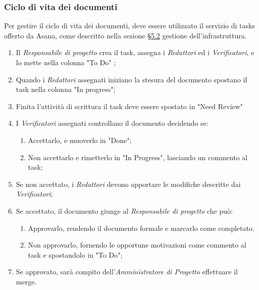 \subsubsection{Ciclo di vita dei documenti}
Per gestire il ciclo di vita dei documenti, deve essere utilizzato il servizio di tasks offerto da Asana, come descritto nella sezione \hyperref[sec:documentversion]{§5.2} gestione dell'infrastruttura.
\begin{enumerate}
\item Il \textit{Responsabile di progetto} crea il task, assegna i \textit{Redattori} ed i \textit{Verificatori}, e lo mette nella colonna "To Do" ;
\item Quando i \textit{Redattori} assegnati iniziano la stesura del documento spostano il task nella colonna "In progress";
\item Finita l'attività di scrittura il task deve essere spostato in "Need Review"
\item I \textit{Verificatori} assegnati controllano il documento decidendo se:
	\begin{enumerate}
	 	\item Accettarlo, e muoverlo in "Done";
	 	\item Non accettarlo e rimetterlo in "In Progress", lasciando un commento al task;
	\end{enumerate}
\item Se non accettato, i \textit{Redattori} devono apportare le modifiche descritte dai \textit{Verificatori};
\item Se accettato, il documento giunge al \textit{Responsabile di progetto} che può:
\begin{enumerate}
	\item Approvarlo, rendendo il documento formale e marcarlo come completato.
	\item Non approvarlo, fornendo le opportune motivazioni come commento al task e spostandolo in "To Do";
\end{enumerate}
\item Se approvato, sarà compito dell'\textit{Amministratore di Progetto} effettuare il merge.
\end{enumerate}
